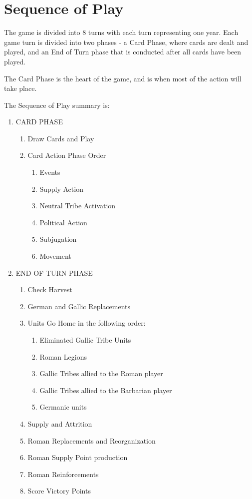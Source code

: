 \section{Sequence of Play}

The game is divided into 8 turns with each turn representing one year. Each game turn is divided into two phases - a Card Phase, where cards are dealt and played, and an End of Turn phase that is conducted after all cards have been played.

The Card Phase is the heart of the game, and is when most of the action will take place.

The Sequence of Play summary is:

\begin{samepage}
\renewcommand{\labelenumii}{\Alph{enumii}.}
\begin{enumerate}
    \item CARD PHASE
    \begin{enumerate}
        \item Draw Cards and Play
        \item Card Action Phase Order
        \begin{enumerate}
            \item Events
            \item Supply Action
            \item Neutral Tribe Activation
            \item Political Action
            \item Subjugation
            \item Movement
        \end{enumerate}
    \end{enumerate}
    \item END OF TURN PHASE
    \begin{enumerate}
        \item Check Harvest
        \item German and Gallic Replacements
        \item Units Go Home in the following order:
        \begin{enumerate}
            \item Eliminated Gallic Tribe Units
            \item Roman Legions
            \item Gallic Tribes allied to the Roman player
            \item Gallic Tribes allied to the Barbarian player
            \item Germanic units
        \end{enumerate}
        \item Supply and Attrition
        \item Roman Replacements and Reorganization
        \item Roman Supply Point production
        \item Roman Reinforcements
        \item Score Victory Points
    \end{enumerate}
\end{enumerate}
\end{samepage}